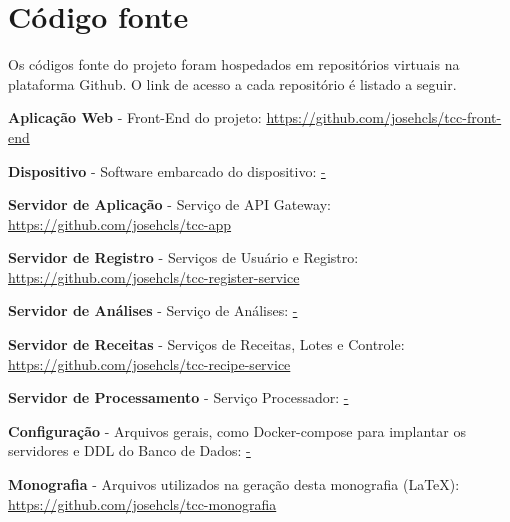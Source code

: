 \chapter{Código fonte}

Os códigos fonte do projeto foram hospedados em repositórios virtuais na plataforma Github. O link de acesso a cada repositório é listado a seguir.



\textbf{Aplicação Web} - Front-End do projeto: \url{https://github.com/josehcls/tcc-front-end}


\textbf{Dispositivo} - Software embarcado do dispositivo: \url{-}


\textbf{Servidor de Aplicação} - Serviço de API Gateway: \url{https://github.com/josehcls/tcc-app}


\textbf{Servidor de Registro} - Serviços de Usuário e Registro: \url{https://github.com/josehcls/tcc-register-service}


\textbf{Servidor de Análises} - Serviço de Análises: \url{-}


\textbf{Servidor de Receitas} - Serviços de Receitas, Lotes e Controle: \url{https://github.com/josehcls/tcc-recipe-service}


\textbf{Servidor de Processamento} - Serviço Processador: \url{-}


\textbf{Configuração} - Arquivos gerais, como Docker-compose para implantar os servidores e DDL do Banco de Dados: \url{-}


\textbf{Monografia} - Arquivos utilizados na geração desta monografia (LaTeX): \url{https://github.com/josehcls/tcc-monografia}

